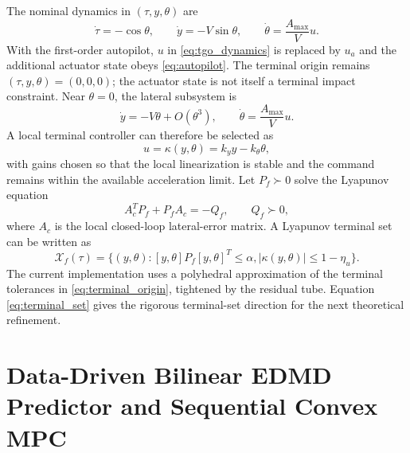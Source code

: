 \documentclass[letterpaper,journal]{IEEEtran}
\begin{document}
The nominal dynamics in $(\tau,y,\theta)$ are
\begin{equation}
    \dot\tau=-\cos\theta,\qquad
    \dot y=-V\sin\theta,\qquad
    \dot\theta=\frac{A_{\max}}{V}u .
    \label{eq:tgo_dynamics}
\end{equation}
With the first-order autopilot, $u$ in \eqref{eq:tgo_dynamics} is replaced by $u_a$ and the additional actuator state obeys \eqref{eq:autopilot}. The terminal origin remains $(\tau,y,\theta)=(0,0,0)$; the actuator state is not itself a terminal impact constraint.
Near $\theta=0$, the lateral subsystem is
\begin{equation}
    \dot y=-V\theta+O(\theta^3),\qquad
    \dot\theta=\frac{A_{\max}}{V}u .
\end{equation}
A local terminal controller can therefore be selected as
\begin{equation}
    u=\kappa(y,\theta)=k_y y-k_\theta\theta ,
\end{equation}
with gains chosen so that the local linearization is stable and the command remains within the available acceleration limit. Let $P_f\succ0$ solve the Lyapunov equation
\begin{equation}
    A_c^TP_f+P_fA_c=-Q_f,\qquad Q_f\succ0 ,
\end{equation}
where $A_c$ is the local closed-loop lateral-error matrix. A Lyapunov terminal set can be written as
\begin{equation}
    \mathcal X_f(\tau)=
    \{(y,\theta):[y,\theta]P_f[y,\theta]^T\le\alpha,
    |\kappa(y,\theta)|\le 1-\eta_u\}.
    \label{eq:terminal_set}
\end{equation}
The current implementation uses a polyhedral approximation of the terminal tolerances in \eqref{eq:terminal_origin}, tightened by the residual tube. Equation \eqref{eq:terminal_set} gives the rigorous terminal-set direction for the next theoretical refinement.

\section{Data-Driven Bilinear EDMD Predictor and Sequential Convex MPC}
\end{document}
